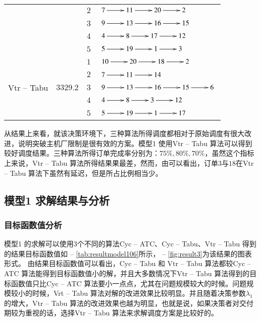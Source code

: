 \begin{table}[h!]
\begin{tabular}{cccl}
          &       & $2$     & $\xymatrix{7 \ar[r] & 11 \ar[r] & 20 \ar[r] & 2}$ \\
          &       & $3$     &  $\xymatrix{9 \ar[r] & 13 \ar[r] & 16 \ar[r] & 15}$\\
          &       & $4$     &  $\xymatrix{4 \ar[r] & 8 \ar[r] & 17 \ar[r] & 12}$\\
          &       & $5$     &  $\xymatrix{5 \ar[r] & 19 \ar[r] & 1 \ar[r] & 3}$\\
       \hline
    \multirow{5}[2]{*}{Vtr -- Tabu} & \multirow{5}[2]{*}{$3329.2$} & $1$     &  $\xymatrix{10 \ar[r] & 20 \ar[r] & 18 \ar[r] & 2}$\\
          &       & $2$     & $\xymatrix{7 \ar[r] & 11 \ar[r] & 14 }$ \\
          &       & $3$     &  $\xymatrix{9 \ar[r] & 13 \ar[r] & 16 \ar[r] & 15\ar[r]&6}$\\
          &       & $4$     &  $\xymatrix{4\ar[r] & 8 \ar[r] & 3 \ar[r] & 12}$\\
          &       & $5$     &  $\xymatrix{5 \ar[r] & 19 \ar[r] & 1 \ar[r] & 17}$\\
    \bottomrule
    \end{tabular}
  \label{tab:resultexample20}
\end{table}

从结果上来看，就该决策环境下，三种算法所得调度都相对于原始调度有很大改进，说明突破主机厂限制是很有效的方案。模型1 使用Vtr -- Tabu 算法可以得到较好调度结果。三种算法所得订单完成率分别为：$75\%, 80\%, 70\%$，虽然这个指标上来说，Vtr -- Tabu 算法所得结果果最差，然而，由可以看出，订单$3$与$18$在Vtr -- Tabu 算法下虽然有延迟，但是所占比例相当少。
\subsection{模型1 求解结果与分析}
\subsubsection{目标函数值分析}
模型1 的求解可以使用3个不同的算法Cyc -- ATC、Cyc -- Tabu、Vtr -- Tabu 得到的结果目标函数值如 -- \ref{tab:resultmodel106}所示， -- \ref{fig:result3}为该结果的图表形式。
由结果目标函数值可以看出，Cyc -- Tabu 和 Vtr -- Tabu 算法都较Cyc -- ATC 算法能得到目标函数值小的解，并且大多数情况下Vtr -- Tabu 算法得到的目标函数值只比Cyc -- ATC 算法要小一点点，尤其在问题规模较大的时候。问题规模较小的时候，Vrt -- Tabu 算法对解的改进效果比较明显。并且随着决策参数$\lambda_1$的增大，Vtr -- Tabu 算法的改进效果也越为明显，也就是说，如果决策者对交付期较为重视的话，选择Vtr -- Tabu 算法来求解调度方案是比较好的。

